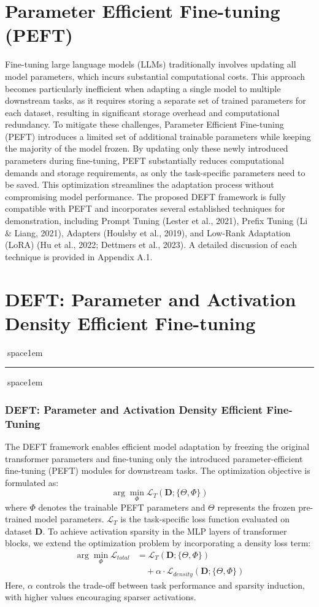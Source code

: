 \documentclass[conference]{IEEEtran}
\begin{document}
\section{Parameter Efficient Fine-tuning (PEFT)}

Fine-tuning large language models (LLMs) traditionally involves updating all model parameters, which incurs substantial computational costs. This approach becomes particularly inefficient when adapting a single model to multiple downstream tasks, as it requires storing a separate set of trained parameters for each dataset, resulting in significant storage overhead and computational redundancy. To mitigate these challenges, Parameter Efficient Fine-tuning (PEFT) introduces a limited set of additional trainable parameters while keeping the majority of the model frozen. By updating only these newly introduced parameters during fine-tuning, PEFT substantially reduces computational demands and storage requirements, as only the task-specific parameters need to be saved. This optimization streamlines the adaptation process without compromising model performance. The proposed DEFT framework is fully compatible with PEFT and incorporates several established techniques for demonstration, including Prompt Tuning (Lester et al., 2021), Prefix Tuning (Li \& Liang, 2021), Adapters (Houlsby et al., 2019), and Low-Rank Adaptation (LoRA) (Hu et al., 2022; Dettmers et al., 2023). A detailed discussion of each technique is provided in Appendix A.1.




\section{DEFT: Parameter and Activation Density Efficient Fine-tuning}

space{1em} \hrule space{1em}
\subsubsection*{DEFT: Parameter and Activation Density Efficient Fine-Tuning}
The DEFT framework enables efficient model adaptation by freezing the original transformer parameters and fine-tuning only the introduced parameter-efficient fine-tuning (PEFT) modules for downstream tasks. The optimization objective is formulated as:
\[\arg\min_{\Phi} \mathcal{L}_{T}\left(\mathbf{D}; \{\Theta, \Phi\}\right)\]
where \(\Phi\) denotes the trainable PEFT parameters and \(\Theta\) represents the frozen pre-trained model parameters. \(\mathcal{L}_{T}\) is the task-specific loss function evaluated on dataset \(\mathbf{D}\). To achieve activation sparsity in the MLP layers of transformer blocks, we extend the optimization problem by incorporating a density loss term:
\[\begin{aligned}
\arg\min_{\Phi} \mathcal{L}_{total} &= \mathcal{L}_{T}\left(\mathbf{D}; \{\Theta, \Phi\}\right) \\
&\quad + \alpha \cdot \mathcal{L}_{density}\left(\mathbf{D}; \{\Theta, \Phi\}\right)
\end{aligned}\]
Here, \(\alpha\) controls the trade-off between task performance and sparsity induction, with higher values encouraging sparser activations.
\end{document}
